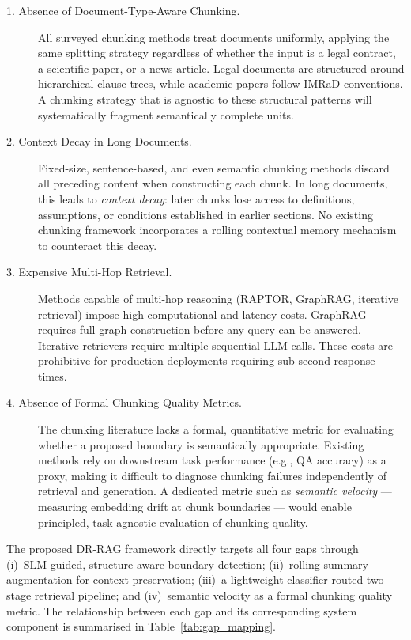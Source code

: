 \documentclass[12pt,a4paper]{article}
\begin{document}
\begin{description}
\item[1. Absence of Document-Type-Aware Chunking.]
All surveyed chunking methods treat documents uniformly, applying the same
splitting strategy regardless of whether the input is a legal contract, a
scientific paper, or a news article. Legal documents are structured around
hierarchical clause trees, while academic papers follow IMRaD conventions.
A chunking strategy that is agnostic to these structural patterns will
systematically fragment semantically complete units.

\item[2. Context Decay in Long Documents.]
Fixed-size, sentence-based, and even semantic chunking methods discard all
preceding content when constructing each chunk. In long documents, this
leads to \emph{context decay}: later chunks lose access to definitions,
assumptions, or conditions established in earlier sections. No existing
chunking framework incorporates a rolling contextual memory mechanism to
counteract this decay.

\item[3. Expensive Multi-Hop Retrieval.]
Methods capable of multi-hop reasoning (RAPTOR, GraphRAG, iterative
retrieval) impose high computational and latency costs. GraphRAG requires
full graph construction before any query can be answered. Iterative
retrievers require multiple sequential LLM calls. These costs are
prohibitive for production deployments requiring sub-second response times.

\item[4. Absence of Formal Chunking Quality Metrics.]
The chunking literature lacks a formal, quantitative metric for evaluating
whether a proposed boundary is semantically appropriate. Existing methods
rely on downstream task performance (e.g., QA accuracy) as a proxy, making
it difficult to diagnose chunking failures independently of retrieval and
generation. A dedicated metric such as \emph{semantic velocity} --- measuring
embedding drift at chunk boundaries --- would enable principled, task-agnostic
evaluation of chunking quality.
\end{description}

The proposed DR-RAG framework directly targets all four gaps through
(i)~SLM-guided, structure-aware boundary detection; (ii)~rolling summary
augmentation for context preservation; (iii)~a lightweight classifier-routed
two-stage retrieval pipeline; and (iv)~semantic velocity as a formal chunking
quality metric. The relationship between each gap and its corresponding
system component is summarised in Table~\ref{tab:gap_mapping}.
\end{document}
